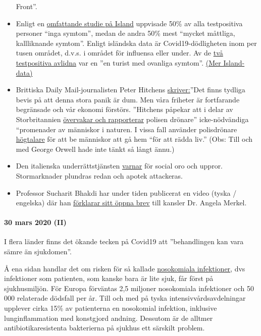 \begin{itemize}
  Front''.
\item
  Enligt en
  \href{https://www.buzzfeed.com/albertonardelli/coronavirus-testing-iceland}{omfattande
  studie på Island} uppvisade 50\% av alla testpositiva personer ``inga
  symtom'', medan de andra 50\% mest ``mycket måttliga, kallliknande
  symtom''. Enligt isländska data är Covid19-dödligheten inom per tusen
  området, d.v.s. i området för influensa eller under. Av de
  \href{https://www.government.is/news/article/?newsid=c65cf658-6eb6-11ea-9462-005056bc4d74}{två
  testpositiva avlidna} var en ''en turist med ovanliga symtom''.
  \href{https://www.covid.is/data}{(Mer Island-data)}
\item
  Brittiska Daily Mail-journalisten Peter Hitchens
  \href{https://hitchensblog.mailonsunday.co.uk/2020/03/theres-powerful-evidence-this-great-panic-is-foolish-yet-our-freedom-is-still-broken-and-our-economy.html}{skriver:}''Det
  finns tydliga bevis på att denna stora panik är dum. Men våra friheter
  är fortfarande begränsade och vår ekonomi förstörs. ''Hitchens påpekar
  att i delar av Storbritannien
  \href{https://www.youtube.com/watch?v=fHNxDzLsPeg}{övervakar och
  rapporterar} polisen drönare'' icke-nödvändiga ``promenader av
  människor i naturen. I vissa fall använder polisdrönare
  \href{https://www.youtube.com/watch?v=D4GEZjUTkqc}{högtalare} för att
  be människor att gå hem ``för att rädda liv.'' (Obs: Till och med
  George Orwell hade inte tänkt så långt ännu.)
\item
  Den italienska underrättstjänsten
  \href{https://www.focus.de/panorama/welt/sorge-vor-sozialen-unruhen-supermaerkte-gepluendert-apotheken-ueberfallen-italiens-geheimdienst-warnt-vor-aufstaenden_id_11826664.html}{varnar}
  för social oro och uppror. Stormarknader plundras redan och apotek
  attackeras.
\item
  Professor Sucharit Bhakdi har under tiden publicerat en video (tyska /
  engelska) där han \href{https://mail.protonmail.com/v}{förklarar sitt
  öppna brev} till kansler Dr. Angela Merkel.
\end{itemize}

\hypertarget{30-mars-2020-ii}{%
\paragraph{30 mars 2020 (II)}\label{30-mars-2020-ii}}

I flera länder finns det ökande tecken på Covid19 att ''behandlingen kan
vara sämre än sjukdomen''.

Å ena sidan handlar det om risken för så kallade
\href{https://de.wikipedia.org/wiki/Nosokomiale_Infektion}{nosokomiala
infektioner}, dvs infektioner som patienten, som kanske bara är lite
sjuk, får först på sjukhusmiljön. För Europa förväntas 2,5 miljoner
nosokomiala infektioner och 50 000 relaterade dödsfall per år. Till och
med på tyska intensivvårdsavdelningar upplever cirka 15\% av patienterna
en nosokomial infektion, inklusive lunginflammation med konstgjord
andning. Dessutom är de alltmer antibiotikaresistenta bakterierna på
sjukhus ett särskilt problem.

